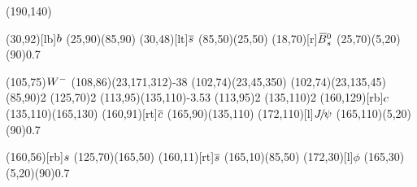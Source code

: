 \documentclass{standalone}
\begin{document}
\begin{axopicture}(190,140)

  \Text(30,92)[lb]{${b}$}                              %
  \Line[arrow](25,90)(85,90)                               %
  \Text(30,48)[lt]{${\overline {{s}}}$}                           %
  \Line[arrow](85,50)(25,50)                               %
  \Text(18,70)[r]{${{\kern 0.18em\overline{\kern -0.18em B}}{}^0_{s}}$}                                  %
  \GOval(25,70)(5,20)(90){0.7}                             %
                                                           
  \Text(105,75){\small{${W^-}$}}                             %
  \PhotonArc(108,86)(23,171,312){-3}{8}                    %
  \Arc[arrow,clockwise,arrowpos=0.35](102,74)(23,45,350)   %
  \Arc[arrow,clockwise,arrowpos=0.45](102,74)(23,135,45)   %
  \Vertex(85,90){2}                                        %
  \Vertex(125,70){2}                                       %
  \Gluon(113,95)(135,110){-3.5}{3}                         %
  \Vertex(113,95){2}                                       %
  \Vertex(135,110){2}                                      %
  \Text(160,129)[rb]{${c}$}                            %
  \Line[arrow](135,110)(165,130)                           %
  \Text(160,91)[rt]{${\overline {{c}}}$}                          %
  \Line[arrow](165,90)(135,110)                            %
  \Text(172,110)[l]{${{J\mskip -3mu/\mskip -2mu\psi}}$}                               %
  \GOval(165,110)(5,20)(90){0.7}                           %
                                                           
  \Text(160,56)[rb]{${s}$}                             %
  \Line[arrow](125,70)(165,50)                             %
  \Text(160,11)[rt]{${\overline {{s}}}$}                          %
  \Line[arrow](165,10)(85,50)                              %
  \Text(172,30)[l]{$\phi$}                                 %
  \GOval(165,30)(5,20)(90){0.7}                            %
                                                           
\end{axopicture}
\end{document}
